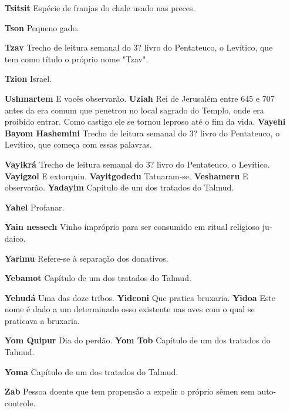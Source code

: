 \begin{itemize}
\item[\textbf{Tsitsit}] Espécie de franjas do chale usado nas preces.

\item[\textbf{Tson}] Pequeno gado.

\item[\textbf{Tzav}] Trecho de leitura semanal do 3? livro do Pentateuco, o
Levítico, que tem como título o próprio nome "Tzav".

\item[\textbf{Tzion}] Israel.

\item[\textbf{Ushmartem} E vocês observarão. \textbf{Uziah}] Rei de
Jerusalém entre 645 e 707 antes da era comum que penetrou no local
sagrado do Templo, onde era proibido entrar. Como castigo ele se tornou
leproso até o fim da vida. \textbf{Vayehi Bayom Hashemini} Trecho de
leitura semanal do 3? livro do Pen­tateuco, o Levítico, que começa com
essas palavras.

\item[\textbf{Vayikrá}] Trecho de leitura semanal do 3? livro do Pentateuco,
o Levítico. \textbf{Vayigzol} E extorquiu. \textbf{Vayitgodedu}
Tatuaram-se. \textbf{Veshameru} E observarão. \textbf{Yadayim}
Capítulo de um dos trata­dos do Talmud.

\item[\textbf{Yahel}] Profanar.

\item[\textbf{Yain nessech}] Vinho impróprio pa­ra ser consumido em ritual
religioso ju­daico.

\item[\textbf{Yarimu}] Refere-se à separação dos donativos.

\item[\textbf{Yebamot}] Capítulo de um dos trata­dos do Talmud.

\item[\textbf{Yehudá} Uma das doze tribos. \textbf{Yideoni}] Que pratica
bruxaria. \textbf{Yidoa} Este nome é dado a um deter­minado osso
existente nas aves com o qual se praticava a bruxaria.

\item[\textbf{Yom Quipur} Dia do perdão. \textbf{Yom Tob}] Capítulo de um
dos trata­dos do Talmud.

\item[\textbf{Yoma}] Capítulo de um dos tratados do Talmud.

\item[\textbf{Zab}] Pessoa doente que tem propen­são a expelir o próprio
sêmen sem au­to-controle.


\end{itemize}
